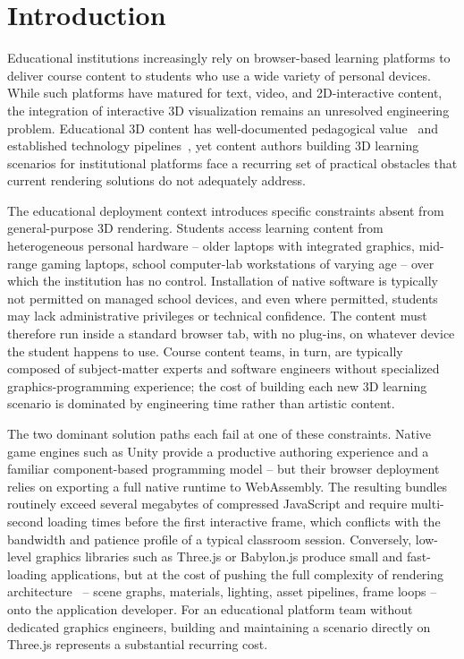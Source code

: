 \section{Introduction}
Educational institutions increasingly rely on browser-based learning platforms to deliver course content to students who use a wide variety of personal devices. While such platforms have matured for text, video, and 2D-interactive content, the integration of interactive 3D visualization remains an unresolved engineering problem. Educational 3D content has well-documented pedagogical value~\cite{Li2021,Yang2024} and established technology pipelines~\cite{Rodrguez2021,Hensen2023}, yet content authors building 3D learning scenarios for institutional platforms face a recurring set of practical obstacles that current rendering solutions do not adequately address.

The educational deployment context introduces specific constraints absent from general-purpose 3D rendering. Students access learning content from heterogeneous personal hardware -- older laptops with integrated graphics, mid-range gaming laptops, school computer-lab workstations of varying age -- over which the institution has no control. Installation of native software is typically not permitted on managed school devices, and even where permitted, students may lack administrative privileges or technical confidence. The content must therefore run inside a standard browser tab, with no plug-ins, on whatever device the student happens to use. Course content teams, in turn, are typically composed of subject-matter experts and software engineers without specialized graphics-programming experience; the cost of building each new 3D learning scenario is dominated by engineering time rather than artistic content.

The two dominant solution paths each fail at one of these constraints. Native game engines such as Unity provide a productive authoring experience and a familiar component-based programming model -- but their browser deployment relies on exporting a full native runtime to WebAssembly. The resulting bundles routinely exceed several megabytes of compressed JavaScript and require multi-second loading times before the first interactive frame, which conflicts with the bandwidth and patience profile of a typical classroom session. Conversely, low-level graphics libraries such as Three.js or Babylon.js produce small and fast-loading applications, but at the cost of pushing the full complexity of rendering architecture~\cite{Evans2014} -- scene graphs, materials, lighting, asset pipelines, frame loops -- onto the application developer. For an educational platform team without dedicated graphics engineers, building and maintaining a scenario directly on Three.js represents a substantial recurring cost.

